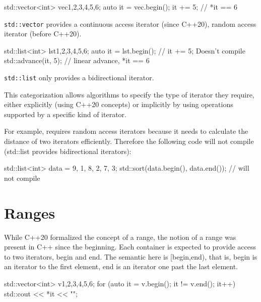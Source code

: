 \begin{box-note}
\begin{cppcode}
std::vector<int> vec{1,2,3,4,5,6};
auto it = vec.begin();
it += 5; // *it == 6
\end{cppcode}
\noindent\small\texttt{std::vector} provides a continuous access iterator (since C++20), random access iterator (before C++20).
\end{box-note}

\begin{box-note}
\begin{cppcode}
std::list<int> lst{1,2,3,4,5,6};
auto it = lst.begin();
// it += 5; Doesn't compile
std::advance(it, 5); // linear advance, *it == 6
\end{cppcode}
\noindent\small\texttt{std::list} only provides a bidirectional iterator.
\end{box-note}

This categorization allows algorithms to specify the type of iterator they require, either explicitly (using C++20 concepts) or implicitly by using operations supported by a specific kind of iterator.

For example, \emph{} requires random access iterators because it needs to calculate the distance of two iterators efficiently. Therefore the following code will not compile (std::list provides bidirectional iterators):

\begin{box-note}
\begin{cppcode}
std::list<int> data = { 9, 1, 8, 2, 7, 3};
std::sort(data.begin(), data.end()); // will not compile
\end{cppcode}
\end{box-note}

\section{Ranges}

While C++20 formalized the concept of a range, the notion of a range was present in C++ since the beginning. Each container is expected to provide access to two iterators, begin and end. The semantic here is [begin,end), that is, begin is an iterator to the first element, end is an iterator one past the last element.

\begin{box-note}
\begin{cppcode}
std::vector<int> v{1,2,3,4,5,6};
for (auto it = v.begin(); it != v.end(); it++) {
    std::cout << *it << "\n";
}
\end{cppcode}
\end{box-note}

